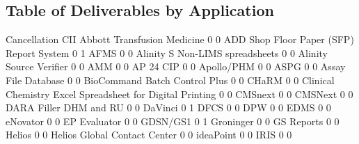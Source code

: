 \documentclass{article}
\begin{document}
\subsection{Table of Deliverables by Application}
\begin{Schunk}
\begin{Soutput}
                                                            Cancellation CII
  Abbott Transfusion Medicine                                          0   0
  ADD Shop Floor Paper (SFP) Report System                             0   1
  AFMS                                                                 0   0
  Alinity S Non-LIMS spreadsheets                                      0   0
  Alinity Source Verifier                                              0   0
  AMM                                                                  0   0
  AP 24 CIP                                                            0   0
  Apollo/PHM                                                           0   0
  ASPG                                                                 0   0
  Assay File Database                                                  0   0
  BioCommand Batch Control Plus                                        0   0
  CHaRM                                                                0   0
  Clinical Chemistry Excel Spreadsheet for Digital Printing            0   0
  CMSnext                                                              0   0
  CMSNext                                                              0   0
  DARA Filler DHM and RU                                               0   0
  DaVinci                                                              0   1
  DFCS                                                                 0   0
  DPW                                                                  0   0
  EDMS                                                                 0   0
  eNovator                                                             0   0
  EP Evaluator                                                         0   0
  GDSN/GS1                                                             0   1
  Groninger                                                            0   0
  GS Reports                                                           0   0
  Helios                                                               0   0
  Helios Global Contact Center                                         0   0
  ideaPoint                                                            0   0
  IRIS                                                                 0   0

\end{Soutput}
\end{Schunk}
\end{document}
